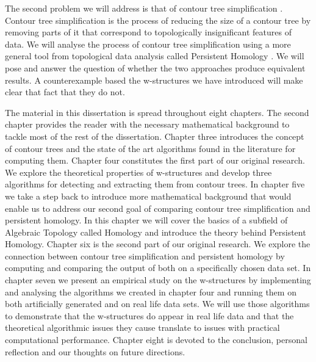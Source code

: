 The second problem we will address is that of contour tree simplification \cite{ct-branch-decomp}. Contour tree simplification is the process of reducing the size of a contour tree by removing parts of it that correspond to topologically insignificant  features of data. We will analyse the process of contour tree simplification using a more general tool from topological data analysis called Persistent Homology \cite{ph-a-survey}. We will pose and answer the question of whether the two approaches produce equivalent results. A counterexample based the w-structures we have introduced will make clear that fact that they do not.

The material in this dissertation is spread throughout eight chapters. The second chapter provides the reader with the necessary mathematical background to tackle most of the rest of the dissertation. Chapter three introduces the concept of contour trees and the state of the art algorithms found in the literature for computing them. Chapter four constitutes the first part of our original research. We explore the theoretical properties of w-structures and develop three algorithms for detecting and extracting them from contour trees. In chapter five we take a step back to introduce more mathematical background that would enable us to address our second goal of comparing contour tree simplification and persistent homology. In this chapter we will cover the basics of a subfield of Algebraic Topology called Homology and introduce the theory behind Persistent Homology. Chapter six is the second part of our original research. We explore the connection between contour tree simplification and persistent homology by computing and comparing the output of both on a specifically chosen data set. In chapter seven we present an empirical study on the w-structures by implementing and analysing the algorithms we created in chapter four and running them on both artificially generated and on real life data sets. We will use those algorithms to demonstrate that the w-structures do appear in real life data and that the theoretical algorithmic issues they cause translate to issues with practical computational performance. Chapter eight is devoted to the conclusion, personal reflection and our thoughts on future directions.
